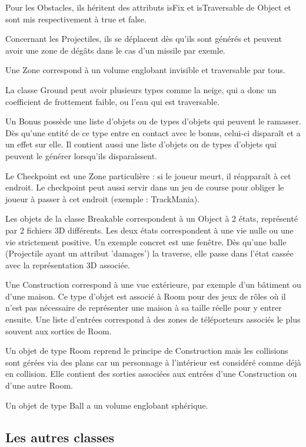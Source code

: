 Pour les Obstacles, ils héritent des attributs isFix et isTraversable de Object et sont mis respectivement à true et false.

Concernant les Projectiles, ils se déplacent dès qu'ils sont générés et peuvent avoir une zone de dégâts dans le cas d'un missile par exemle.

Une Zone correspond à un volume englobant invisible et traversable par tous.

La classe Ground peut avoir plusieurs types comme la neige, qui a donc un coefficient de frottement faible, ou l'eau qui est traversable.

Un Bonus possède une liste d'objets ou de types d'objets qui peuvent le ramasser. Dès qu'une entité de ce type entre en contact avec le bonus, celui-ci
disparaît et a un effet sur elle. 
Il contient aussi une liste d'objets ou de types d'objets qui peuvent le générer lorsqu'ils disparaîssent.

Le Checkpoint est une Zone particulière : si le joueur meurt, il réapparaît à cet endroit. 
Le checkpoint peut aussi servir dans un jeu de course pour obliger le joueur à passer à cet endroit (exemple : TrackMania).

Les objets de la classe Breakable correspondent à un Object à 2 états, représenté par 2 fichiers 3D différents. Les deux états correspondent
à une vie nulle ou une vie strictement positive. Un exemple concret est une fenêtre. 
Dès qu'une balle (Projectile ayant un attribut 'damages') la traverse, elle passe dans l'état cassée avec la représentation 3D associée.

Une Construction correspond à une vue extérieure, par exemple d'un bâtiment ou d'une maison.
Ce type d'objet est associé à Room pour des jeux de rôles où il n'est pas nécessaire de représenter une maison à sa taille réelle pour y entrer ensuite.
Une liste d'entrées correspond à des zones de téléporteurs associés le plus souvent aux sorties de Room.

Un objet de type Room reprend le principe de Construction mais les collisions sont gérées via des plans car un personnage à l'intérieur est considéré comme déjà en collision. 
Elle contient des sorties associées aux entrées d'une Construction ou d'une autre Room.

Un objet de type Ball a un volume englobant sphérique.

\subsection{Les autres classes}

